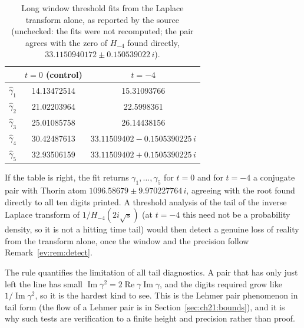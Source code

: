 \begin{table}[h]\centering\small
\begin{tabular}{ccc}
\toprule
 & $t=0$ (control) & $t=-4$\\
\midrule
$\widehat\gamma_1$ & 14.13472514 & 15.31093766\\
$\widehat\gamma_2$ & 21.02203964 & 22.5998361\\
$\widehat\gamma_3$ & 25.01085758 & 26.14438156\\
$\widehat\gamma_4$ & 30.42487613 & $33.11509402-0.1505390225\,i$\\
$\widehat\gamma_5$ & 32.93506159 & $33.11509402+0.1505390225\,i$\\
\bottomrule
\end{tabular}
\caption{Long window threshold fits from the Laplace transform alone, as reported by the source (unchecked: the fits were not recomputed; the pair agrees with the zero of $H_{-4}$ found directly, $33.1150940172\pm0.150539022\,i$).}\label{ev:tab:detect}
\end{table}

If the table is right, the fit returns $\gamma_1,\ldots,\gamma_5$ for $t=0$ and for $t=-4$ a conjugate pair with Thorin atom $1096.58679\pm9.970227764\,i$, agreeing with the root found directly to all ten digits printed. A threshold analysis of the tail of the inverse Laplace transform of $1/H_{-4}(2i\sqrt s)$ (at $t=-4$ this need not be a probability density, so it is not a hitting time tail) would then detect a genuine loss of reality from the transform alone, once the window and the precision follow Remark~\ref{ev:rem:detect}.

The rule quantifies the limitation of all tail diagnostics. A pair that has only just left the line has small $\operatorname{Im}\gamma^2=2\operatorname{Re}\gamma\operatorname{Im}\gamma$, and the digits required grow like $1/\operatorname{Im}\gamma^2$, so it is the hardest kind to see. This is the Lehmer pair phenomenon in tail form (the flow of a Lehmer pair is in Section~\ref{sec:ch21:bounds}), and it is why such tests are verification to a finite height and precision rather than proof.

